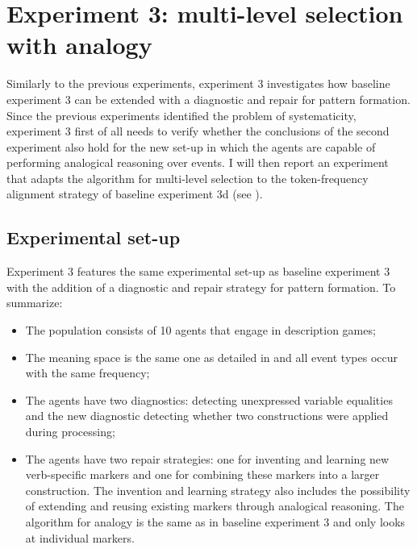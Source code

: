 \section{Experiment 3: multi-level selection with analogy}
\label{s:pattern-exp-3}

Similarly to the previous experiments, experiment 3 investigates how baseline experiment 3 can be extended with a diagnostic and repair for pattern formation. Since the previous experiments identified the problem of systematicity, experiment 3 first of all needs to verify whether the conclusions of the second experiment also hold for the new set-up in which the agents are capable of performing analogical reasoning over events. I will then report an experiment that adapts the algorithm for multi-level selection to the token-frequency alignment strategy of baseline experiment 3d (see ).

\subsection{Experimental set-up}

Experiment 3 features the same experimental set-up as baseline experiment 3 with the addition of a diagnostic and repair strategy for pattern formation. To summarize:

\begin{itemize}
\item The population consists of 10 agents that engage in description games;
\item The meaning space is the same one as detailed in  and all event types occur with the same frequency;
\item The agents have two diagnostics: detecting unexpressed variable equalities and the new diagnostic detecting whether two constructions were applied during processing;
\item The agents have two repair strategies: one for inventing and learning new verb-specific markers and one for combining these markers into a larger construction. The invention and learning strategy also includes the possibility of extending and reusing existing markers through analogical reasoning. The algorithm for analogy is the same as in baseline experiment 3 and only looks at individual markers.
\end{itemize}

